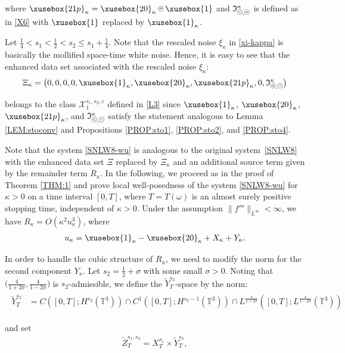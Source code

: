 \documentclass[%
11pt,  reqno]{amsart}
\def\<#1>{\xusebox{#1}}
\newcommand{\pe}{\mathbin{\scaleobj{0.7}{\tikz \draw (0,0) node[shape=circle,draw,inner sep=0pt,minimum size=8.5pt] {\scriptsize  $=$};}}}
\newcommand{\pl}{\mathbin{\scaleobj{0.7}{\tikz \draw (0,0) node[shape=circle,draw,inner sep=0pt,minimum size=8.5pt] {\scriptsize $<$};}}}
\newcommand{\1}{\hspace{0.2mm}\text{I}\hspace{0.2mm}}
\newcommand{\noi}{\noindent}
\newcommand{\T}{\mathbb{T}}
\newcommand{\eps}{\varepsilon}
\newcommand{\kk}{\kappa}
\newcommand{\s}{\sigma}
\newcommand{\wt}{\widetilde}
\renewcommand{\o}{\omega}
\newcommand{\If}{\mathfrak{I}}
\numberwithin{equation}{section}
\numberwithin{theorem}{section}
\begin{document}
\noi
where $\<21p>_\kk = \<20>_\kk\pe \<1>$
and $ \If_{\pl, \pe}^\kk$
is defined as in \eqref{X6} with $\<1>$ replaced by $\<1>_\kk$.


Let $\frac 14 < s_1 < \frac 12 < s_2 \leq s_1 + \frac 14$.
Note that the rescaled noise $\xi_\kk$ in \eqref{xi-kappa}  is basically the mollified
space-time white noise.
Hence, it is easy to see that 
the enhanced data set associated with the rescaled noise $\xi_\kk$:
\begin{align}
\Xi_\kk
= \big(0, 0, 0, 0, \<1>_\kk, \<20>_\kk,  \<21p>_\kk, 
0, 
 \If_{\pl, \pe}^\kk\big)
\label{so6-wu}
\end{align}

\noi
belongs to the class $\mathcal{X}^{s_1, s_2, \eps}_1$ defined in \eqref{L3}
since 
 $\<1>_\kk$, $\<20>_\kk$,  $\<21p>_\kk$,
 and  
$ \If_{\pl, \pe}^\kk$
satisfy the statement analogous
to Lemma \ref{LEM:stoconv}
and  Propositions \ref{PROP:sto1}, \ref{PROP:sto2},  and \ref{PROP:sto4}. 




Note that the system \eqref{SNLW8-wu}
 is analogous to the original system~\eqref{SNLW8}
with the enhanced data set $\Xi$ replaced by $\Xi_\kk$ and  an additional source term given by the remainder
term  $R_\kk$. 
In the following, we  proceed as in the proof of Theorem \ref{THM:1}
and prove 
local well-posedness of the system \eqref{SNLW8-wu}
for  $\kk > 0$ on a time interval $[0, T]$,
where  $T = T(\o)$
is an almost surely positive stopping time, 
independent of $\kk > 0$.
Under the assumption $\|f'''\|_{L^\infty} < \infty$, 
we have  $R_\kk = O(\kk^2 u_\kk^3)$, 
where 
\begin{align*}
 u_\kk =  \<1>_\kk - \<20>_\kk + X_\kk + Y_\kk.
 \end{align*}

\noi
In order to handle the cubic structure of $R_\kk$, 
we need to modify the norm for the second component $Y_\kk$.
Let  $s_2 = \frac 12 + \s$
with some small $\s > 0$.
Noting that 
$\big(\frac{4}{1+2\s}, \frac{4}{1-2\s}\big)$
is $s_2$-admissible,
we define the $\wt Y^{s_2}_T$-space
by the norm:
\begin{align*}
\begin{split}
 \wt Y^{s_2}_T 
 & = C([0,T];H^{s_2}(\T^3))\cap C^1([0,T]; H^{s_2-1}(\T^3))
 \cap L^{\frac{4}{1+2\s}}([0, T]; L^{\frac{4}{1-2\s}}(\T^3))
\end{split}
\end{align*}

\noi
and set 
\begin{align*}
\wt Z^{s_1, s_2}_T =  X^{s_1}_T\times  \wt Y^{s_2}_T,
\end{align*}
\end{document}
